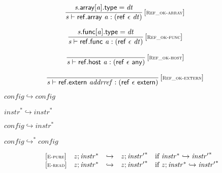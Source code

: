 $$
\begin{array}{@{}c@{}}\displaystyle
\frac{
{\mathit{s}}.\mathsf{array}{}[{\mathit{a}}].\mathsf{type} = {\mathit{dt}}
}{
{\mathit{s}} \vdash \mathsf{ref.array}~{\mathit{a}} : (\mathsf{ref}~\epsilon~{\mathit{dt}})
} \, {[\textsc{\scriptsize Ref\_ok{-}array}]}
\qquad
\end{array}
$$

$$
\begin{array}{@{}c@{}}\displaystyle
\frac{
{\mathit{s}}.\mathsf{func}{}[{\mathit{a}}].\mathsf{type} = {\mathit{dt}}
}{
{\mathit{s}} \vdash \mathsf{ref.func}~{\mathit{a}} : (\mathsf{ref}~\epsilon~{\mathit{dt}})
} \, {[\textsc{\scriptsize Ref\_ok{-}func}]}
\qquad
\end{array}
$$

$$
\begin{array}{@{}c@{}}\displaystyle
\frac{
}{
{\mathit{s}} \vdash \mathsf{ref.host}~{\mathit{a}} : (\mathsf{ref}~\epsilon~\mathsf{any})
} \, {[\textsc{\scriptsize Ref\_ok{-}host}]}
\qquad
\end{array}
$$

$$
\begin{array}{@{}c@{}}\displaystyle
\frac{
}{
{\mathit{s}} \vdash \mathsf{ref.extern}~{\mathit{addrref}} : (\mathsf{ref}~\epsilon~\mathsf{extern})
} \, {[\textsc{\scriptsize Ref\_ok{-}extern}]}
\qquad
\end{array}
$$

$\boxed{{\mathit{config}} \hookrightarrow {\mathit{config}}}$

$\boxed{{{\mathit{instr}}^\ast} \hookrightarrow {{\mathit{instr}}^\ast}}$

$\boxed{{\mathit{config}} \hookrightarrow {{\mathit{instr}}^\ast}}$

$\boxed{{\mathit{config}} \hookrightarrow^\ast {\mathit{config}}}$

$$
\begin{array}{@{}l@{}lcl@{}l@{}}
{[\textsc{\scriptsize E{-}pure}]} \quad & {\mathit{z}} ; {{\mathit{instr}}^\ast} &\hookrightarrow& {\mathit{z}} ; {{\mathit{instr}'}^\ast} &\quad
  \mbox{if}~{{\mathit{instr}}^\ast} \hookrightarrow {{\mathit{instr}'}^\ast} \\
{[\textsc{\scriptsize E{-}read}]} \quad & {\mathit{z}} ; {{\mathit{instr}}^\ast} &\hookrightarrow& {\mathit{z}} ; {{\mathit{instr}'}^\ast} &\quad
  \mbox{if}~{\mathit{z}} ; {{\mathit{instr}}^\ast} \hookrightarrow {{\mathit{instr}'}^\ast} \\
\end{array}
$$

